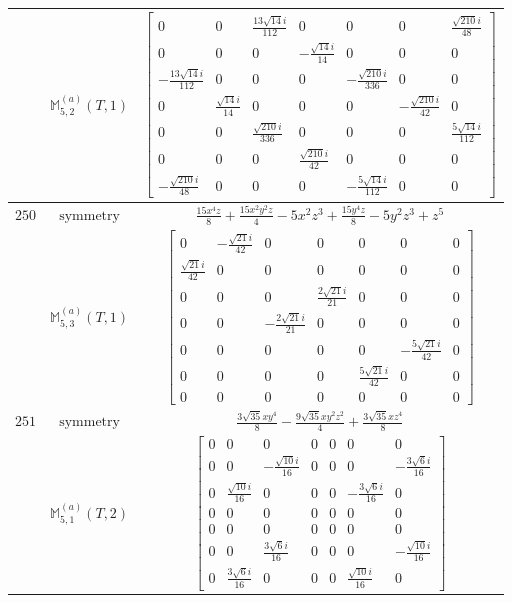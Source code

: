 \documentclass[fleqn,8pt,landscape]{jsarticle}
\begin{document}
\begin{longtable}{ccc}
$  $ & $ \mathbb{M}_{5,2}^{(a)}(T,1) $ & $ \begin{bmatrix} 0 & 0 & \frac{13 \sqrt{14} i}{112} & 0 & 0 & 0 & \frac{\sqrt{210} i}{48} \\ 0 & 0 & 0 & - \frac{\sqrt{14} i}{14} & 0 & 0 & 0 \\ - \frac{13 \sqrt{14} i}{112} & 0 & 0 & 0 & - \frac{\sqrt{210} i}{336} & 0 & 0 \\ 0 & \frac{\sqrt{14} i}{14} & 0 & 0 & 0 & - \frac{\sqrt{210} i}{42} & 0 \\ 0 & 0 & \frac{\sqrt{210} i}{336} & 0 & 0 & 0 & \frac{5 \sqrt{14} i}{112} \\ 0 & 0 & 0 & \frac{\sqrt{210} i}{42} & 0 & 0 & 0 \\ - \frac{\sqrt{210} i}{48} & 0 & 0 & 0 & - \frac{5 \sqrt{14} i}{112} & 0 & 0 \end{bmatrix} $ \\ \hline
$ 250 $ & $ \text{symmetry} $ & $ \frac{15 x^{4} z}{8} + \frac{15 x^{2} y^{2} z}{4} - 5 x^{2} z^{3} + \frac{15 y^{4} z}{8} - 5 y^{2} z^{3} + z^{5} $ \\
$  $ & $ \mathbb{M}_{5,3}^{(a)}(T,1) $ & $ \begin{bmatrix} 0 & - \frac{\sqrt{21} i}{42} & 0 & 0 & 0 & 0 & 0 \\ \frac{\sqrt{21} i}{42} & 0 & 0 & 0 & 0 & 0 & 0 \\ 0 & 0 & 0 & \frac{2 \sqrt{21} i}{21} & 0 & 0 & 0 \\ 0 & 0 & - \frac{2 \sqrt{21} i}{21} & 0 & 0 & 0 & 0 \\ 0 & 0 & 0 & 0 & 0 & - \frac{5 \sqrt{21} i}{42} & 0 \\ 0 & 0 & 0 & 0 & \frac{5 \sqrt{21} i}{42} & 0 & 0 \\ 0 & 0 & 0 & 0 & 0 & 0 & 0 \end{bmatrix} $ \\ \hline
$ 251 $ & $ \text{symmetry} $ & $ \frac{3 \sqrt{35} x y^{4}}{8} - \frac{9 \sqrt{35} x y^{2} z^{2}}{4} + \frac{3 \sqrt{35} x z^{4}}{8} $ \\
$  $ & $ \mathbb{M}_{5,1}^{(a)}(T,2) $ & $ \begin{bmatrix} 0 & 0 & 0 & 0 & 0 & 0 & 0 \\ 0 & 0 & - \frac{\sqrt{10} i}{16} & 0 & 0 & 0 & - \frac{3 \sqrt{6} i}{16} \\ 0 & \frac{\sqrt{10} i}{16} & 0 & 0 & 0 & - \frac{3 \sqrt{6} i}{16} & 0 \\ 0 & 0 & 0 & 0 & 0 & 0 & 0 \\ 0 & 0 & 0 & 0 & 0 & 0 & 0 \\ 0 & 0 & \frac{3 \sqrt{6} i}{16} & 0 & 0 & 0 & - \frac{\sqrt{10} i}{16} \\ 0 & \frac{3 \sqrt{6} i}{16} & 0 & 0 & 0 & \frac{\sqrt{10} i}{16} & 0 \end{bmatrix} $ \\ \hline

\end{longtable}
\end{document}
